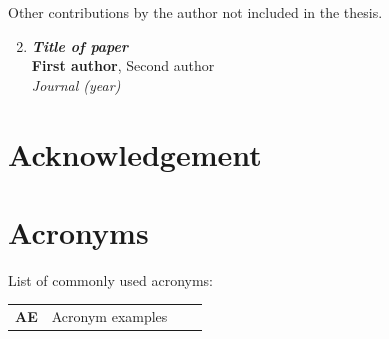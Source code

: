 \documentclass[electronic]{kthesis}
\begin{document}
Other contributions by the author not included in the thesis.
\begin{enumerate}[I]
	\setcounter{enumi}{1}
	\item \textbf{\textit{Title of paper}} \\
		\textbf{First author}, Second author \\
		\textit{Journal (year)}
\end{enumerate}
\chapter{Acknowledgement}
\noindent \lipsum[1]

\chapter{Acronyms}
List of commonly used acronyms: \\

\begin{tabular}{llll}
\textbf{AE}		&	Acronym examples \\

\end{tabular}


\mainmatter %
\tableofcontents

\end{document}
